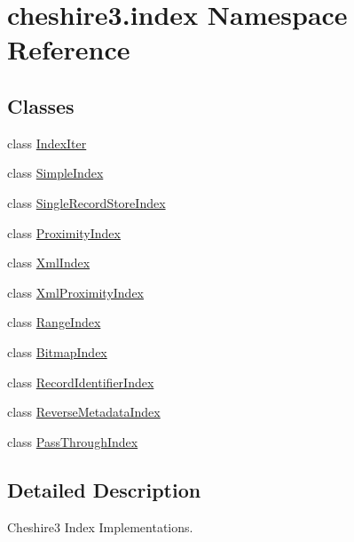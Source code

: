 \hypertarget{namespacecheshire3_1_1index}{\section{cheshire3.\-index Namespace Reference}
\label{namespacecheshire3_1_1index}
}
\subsection*{Classes}
\begin{DoxyCompactItemize}
\item 
class \hyperlink{classcheshire3_1_1index_1_1_index_iter}{Index\-Iter}
\item 
class \hyperlink{classcheshire3_1_1index_1_1_simple_index}{Simple\-Index}
\item 
class \hyperlink{classcheshire3_1_1index_1_1_single_record_store_index}{Single\-Record\-Store\-Index}
\item 
class \hyperlink{classcheshire3_1_1index_1_1_proximity_index}{Proximity\-Index}
\item 
class \hyperlink{classcheshire3_1_1index_1_1_xml_index}{Xml\-Index}
\item 
class \hyperlink{classcheshire3_1_1index_1_1_xml_proximity_index}{Xml\-Proximity\-Index}
\item 
class \hyperlink{classcheshire3_1_1index_1_1_range_index}{Range\-Index}
\item 
class \hyperlink{classcheshire3_1_1index_1_1_bitmap_index}{Bitmap\-Index}
\item 
class \hyperlink{classcheshire3_1_1index_1_1_record_identifier_index}{Record\-Identifier\-Index}
\item 
class \hyperlink{classcheshire3_1_1index_1_1_reverse_metadata_index}{Reverse\-Metadata\-Index}
\item 
class \hyperlink{classcheshire3_1_1index_1_1_pass_through_index}{Pass\-Through\-Index}
\end{DoxyCompactItemize}


\subsection{Detailed Description}
\begin{DoxyVerb}Cheshire3 Index Implementations.\end{DoxyVerb}
 
